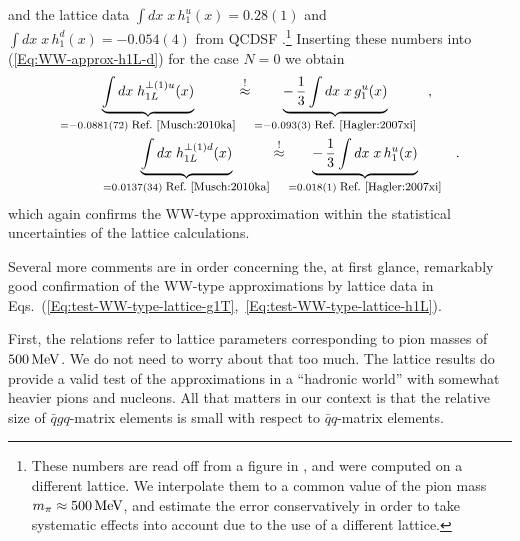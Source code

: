 \documentclass[a4paper,11pt]{article}
\newcommand{\ba}{\begin{eqnarray}}
\newcommand{\ea}{\end{eqnarray}}
\begin{document}
and the lattice data 
$\int d x \;x\,h_1^u(x)= 0.28(1)$ and
$\int d x \;x\,h_1^d(x)= -0.054(4)$
from QCDSF \cite{Gockeler:2005cj}.\footnote{
  These numbers are read off from a figure in \cite{Gockeler:2005cj},
  and were computed on a different lattice. We interpolate them to a
  common value of the pion mass $m_\pi\approx500\,{\rm MeV}$, and
  estimate the error conservatively in order to take systematic effects
  into account due to the use of a different lattice.}
Inserting these numbers into  (\ref{Eq:WW-approx-h1L-d}) for the case
$N=0$ we obtain
\ba
        \underbrace{\int d x\;h_{1L}^{\perp(1)u}(x)}
        _{= -0.0881(72)\;\mbox{\footnotesize Ref.~\cite{Musch:2010ka}}}
        \stackrel{!}{\approx}
        \underbrace{-\,\frac{1}{3}\int d x\;x\,g_1^u(x)}
        _{= -0.093(3) \;\mbox{\footnotesize Ref.~\cite{Hagler:2007xi}}}
        \hspace{3mm} , \hspace{7mm} \nonumber \\
        \underbrace{\int d x\;h_{1L}^{\perp(1)d}(x)}
        _{= 0.0137(34) \;\mbox{\footnotesize Ref.~\cite{Musch:2010ka}}}
        \stackrel{!}{\approx}
        \underbrace{-\,\frac{1}{3}\int d x\;x\,h_1^u(x)}
        _{= 0.018(1) \;\mbox{\footnotesize Ref.~\cite{Hagler:2007xi}}}
        \hspace{3mm}. 
        \label{Eq:test-WW-type-lattice-h1L}
\ea
which again confirms the WW-type approximation within the statistical
uncertainties of the lattice calculations.

Several more comments are in order concerning the, at first glance, remarkably
good confirmation of the  WW-type approximations by lattice data in
Eqs.~(\ref{Eq:test-WW-type-lattice-g1T},~\ref{Eq:test-WW-type-lattice-h1L}).

First, the relations refer to lattice parameters corresponding
to pion masses of $500\,{\rm MeV}$. We do not
need to worry about that too much. The lattice results do provide
a valid test of the approximations in a ``hadronic world'' with
somewhat heavier pions and nucleons. All that matters in our
context is that the relative size of $\bar qgq$-matrix elements
is small with respect to $\bar qq$-matrix elements.
\end{document}
